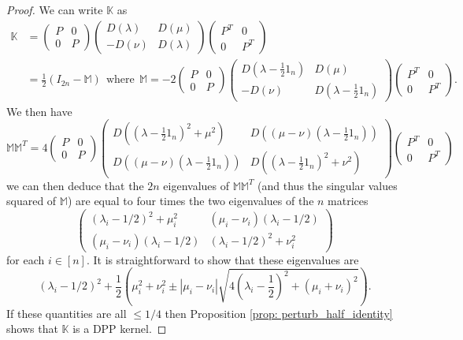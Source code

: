\documentclass{article}
\numberwithin{equation}{section}
\renewcommand{\leq}{\leqslant}
\theoremstyle{plain}
\begin{document}
\begin{proof}
We can write $\mathbb{K}$ as
\begin{align*}
\mathbb{K}&=\begin{pmatrix}
P & 0 \\ 0 & P
\end{pmatrix}\begin{pmatrix}
D(\lambda) & D(\mu) \\ -D(\nu) & D(\lambda)
\end{pmatrix}\begin{pmatrix}
P^T & 0 \\ 0 & P^T
\end{pmatrix}\\
&=\frac{1}{2}\left(I_{2n}-\mathbb{M}\right)~~\mbox{where}~~\mathbb{M}=-2\begin{pmatrix}
P & 0 \\ 0 & P
\end{pmatrix}\begin{pmatrix}
D(\lambda-\frac 1 2 1_n) & D(\mu) \\ -D(\nu) & D(\lambda-\frac 1 2 1_n)
\end{pmatrix}\begin{pmatrix}
P^T & 0 \\ 0 & P^T
\end{pmatrix}.
\end{align*}
We then have
\[\mathbb{M}\mathbb{M}^T=4\begin{pmatrix}
P & 0 \\ 0 & P
\end{pmatrix}\begin{pmatrix}
D((\lambda-\frac 1 2 1_n)^2+\mu^2) & D((\mu-\nu)(\lambda-\frac 1 2 1_n)) \\ D((\mu-\nu)(\lambda-\frac 1 2 1_n)) & D((\lambda-\frac 1 2 1_n)^2+\nu^2)
\end{pmatrix}\begin{pmatrix}
P^T & 0 \\ 0 & P^T
\end{pmatrix}\]
we can then deduce that the $2n$ eigenvalues of $\mathbb{M}\mathbb{M}^T$ (and thus the singular values squared of $\mathbb{M}$) are equal to four times the two eigenvalues of the $n$ matrices
\[\begin{pmatrix}
(\lambda_i-1/2)^2+\mu_i^2 & (\mu_i-\nu_i)(\lambda_i-1/2) \\ (\mu_i-\nu_i)(\lambda_i-1/2) & (\lambda_i-1/2)^2+\nu_i^2
\end{pmatrix}\]
for each $i\in[n]$. It is straightforward to show that these eigenvalues are
\[(\lambda_i-1/2)^2 + \frac{1}{2}\left(\mu_i^2+\nu_i^2\pm|\mu_i-\nu_i|\sqrt{4\left(\lambda_i-\frac{1}{2}\right)^2+(\mu_i+\nu_i)^2}\right).\]
If these quantities are all $\leq 1/4$ then Proposition \ref{prop: perturb_half_identity} shows that $\mathbb{K}$ is a DPP kernel.
\end{proof}
\end{document}
